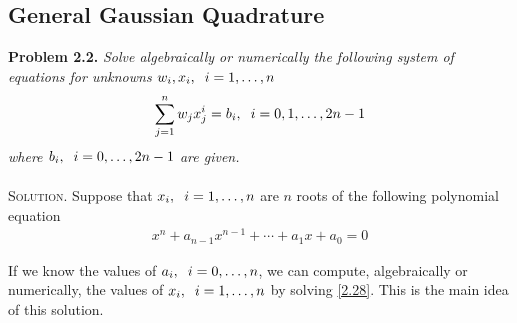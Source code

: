 \documentclass[a4paper]{article}
\numberwithin{equation}{section}
\begin{document}
\subsection{General Gaussian Quadrature}
\textbf{Problem 2.2.} \textit{Solve algebraically or numerically the following system of equations for unknowns $w_i,x_i,\hspace{0.2cm}i=1,\ldots,n$}
\begin{align}
\label{2.27}
\sum\limits_{j = 1}^n {{w_j}x_j^i}  = {b_i},\hspace{0.2cm}i = 0,1, \ldots ,2n - 1
\end{align}
\textit{where $b_i,\hspace{0.2cm}i=0,\ldots,2n-1$ are given.}\\
\\
\textsc{Solution.} Suppose that $x_i,\hspace{0.2cm}i=1,\ldots,n$ are $n$ roots of the following polynomial equation
\begin{align}
\label{2.28}
{x^n} + {a_{n - 1}}{x^{n - 1}} +  \cdots  + {a_1}x + {a_0} = 0
\end{align}

If we know the values of $a_i,\hspace{0.2cm}i=0,\ldots,n$, we can compute, algebraically or numerically, the values of $x_i,\hspace{0.2cm}i=1,\ldots,n$ by solving \eqref{2.28}. This is the main idea of this solution. 
\end{document}
